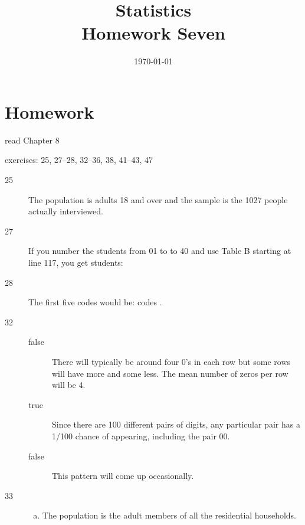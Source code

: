 \documentclass[letterpaper, landscape]{exam}
\title{Statistics \\ Homework Seven}
\date{\today}
\author{}
\begin{document}
  \maketitle

  \section{Homework}
    \begin{itemize*}
      \item read Chapter 8 
      \item exercises: 25, 27--28, 32--36, 38, 41--43, 47
    \end{itemize*}

  \ifprintanswers{}
    \begin{description}

      \item[25] The population is adults 18 and over and the sample is the 1027
        people actually interviewed.

      \item[27] If you number the students from 01 to to 40 and use Table B
        starting at line 117, you get students: 


      \item[28] The first five codes would be: codes 
        .

      \item[32] 
        \begin{description}
          \item[false] There will typically be around four 0's in each row but
            some rows will have more and some less.  The mean number of zeros
            per row will be 4.

          \item[true] Since there are 100 different pairs of digits, any
            particular pair has a 1/100 chance of appearing, including the pair
            00.

          \item[false] This pattern will come up occasionally. 
        \end{description}

      \item[33]
        \begin{enumerate}[(a)]
          \item The population is the adult members of all the residential households.


\end{enumerate}
\end{description}
\end{document}
